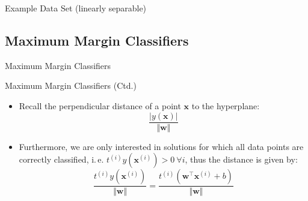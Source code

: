 \begin{frame}{Example Data Set (linearly separable)}{}
\end{frame}


\subsection{Maximum Margin Classifiers}

\begin{frame}{Maximum Margin Classifiers}{}\important
\end{frame}


\begin{frame}{Maximum Margin Classifiers (Ctd.)}{}
	\begin{itemize}
		\item Recall the perpendicular distance of a point $\bm{x}$ to the hyperplane:
		\begin{equation}
			\frac{\vert y(\bm{x}) \vert}{\Vert \bm{w} \Vert}
		\end{equation}
		\item Furthermore, we are only interested in solutions for which all data points are correctly classified, i.\,e. 
			$t^{(i)} y(\bm{x}^{(i)}) > 0\ \forall i$, thus the distance is given by:
		\begin{equation}
			\frac{t^{(i)} y(\bm{x}^{(i)})}{\Vert \bm{w} \Vert} = \frac{t^{(i)} (\bm{w}^{\intercal} \bm{x}^{(i)} + b)}{\Vert \bm{w} \Vert}
		\end{equation}
	\end{itemize}
\end{frame}


